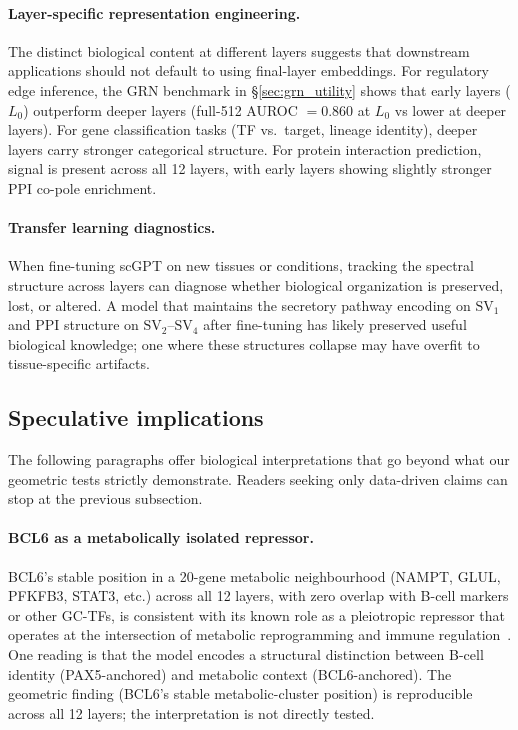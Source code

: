 \documentclass[12pt]{article}
\newcommand{\SV}[1]{\mathrm{SV}_{#1}}
\begin{document}
\paragraph{Layer-specific representation engineering.}
The distinct biological content at different layers suggests that downstream applications should not default to using final-layer embeddings.
For regulatory edge inference, the GRN benchmark in §\ref{sec:grn_utility} shows that early layers ($L_0$) outperform deeper layers (full-512 AUROC $= 0.860$ at $L_0$ vs lower at deeper layers).
For gene classification tasks (TF vs.\ target, lineage identity), deeper layers carry stronger categorical structure.
For protein interaction prediction, signal is present across all 12 layers, with early layers showing slightly stronger PPI co-pole enrichment.

\paragraph{Transfer learning diagnostics.}
When fine-tuning scGPT on new tissues or conditions, tracking the spectral structure across layers can diagnose whether biological organization is preserved, lost, or altered.
A model that maintains the secretory pathway encoding on $\SV{1}$ and PPI structure on $\SV{2}$--$\SV{4}$ after fine-tuning has likely preserved useful biological knowledge; one where these structures collapse may have overfit to tissue-specific artifacts.

\subsection{Speculative implications}
\label{sec:speculative}

The following paragraphs offer biological interpretations that go beyond what our geometric tests strictly demonstrate. Readers seeking only data-driven claims can stop at the previous subsection.

\paragraph{BCL6 as a metabolically isolated repressor.}
BCL6's stable position in a 20-gene metabolic neighbourhood (NAMPT, GLUL, PFKFB3, STAT3, etc.) across all 12 layers, with zero overlap with B-cell markers or other GC-TFs, is consistent with its known role as a pleiotropic repressor that operates at the intersection of metabolic reprogramming and immune regulation~\cite{basso2010bcl6}. One reading is that the model encodes a structural distinction between B-cell identity (PAX5-anchored) and metabolic context (BCL6-anchored). The geometric finding (BCL6's stable metabolic-cluster position) is reproducible across all 12 layers; the interpretation is not directly tested.
\end{document}
